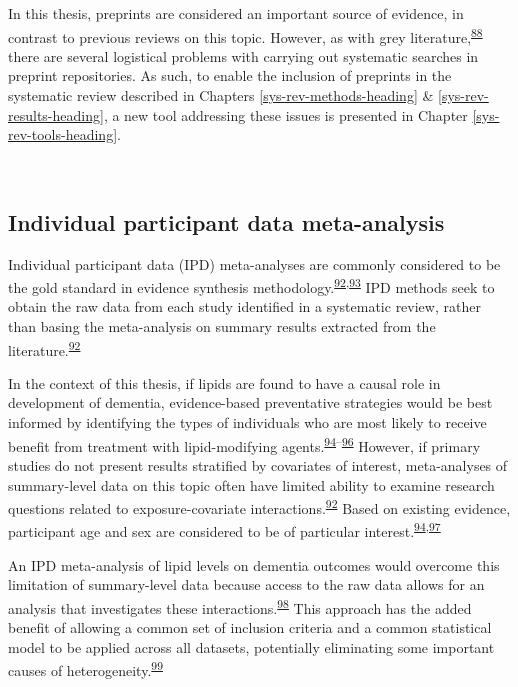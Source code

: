 \documentclass[a4paper, twoside]{templates/ociamthesis}
\begin{document}
In this thesis, preprints are considered an important source of evidence, in contrast to previous reviews on this topic. However, as with grey literature,\textsuperscript{\protect\hyperlink{ref-mahood2014}{88}} there are several logistical problems with carrying out systematic searches in preprint repositories. As such, to enable the inclusion of preprints in the systematic review described in Chapters \ref{sys-rev-methods-heading} \& \ref{sys-rev-results-heading}, a new tool addressing these issues is presented in Chapter \ref{sys-rev-tools-heading}.

~

\hypertarget{individual-participant-data-meta-analysis}{%
\subsection{Individual participant data meta-analysis}\label{individual-participant-data-meta-analysis}}

Individual participant data (IPD) meta-analyses are commonly considered to be the gold standard in evidence synthesis methodology.\textsuperscript{\protect\hyperlink{ref-riley2010}{92},\protect\hyperlink{ref-stewart1993}{93}} IPD methods seek to obtain the raw data from each study identified in a systematic review, rather than basing the meta-analysis on summary results extracted from the literature.\textsuperscript{\protect\hyperlink{ref-riley2010}{92}}

In the context of this thesis, if lipids are found to have a causal role in development of dementia, evidence-based preventative strategies would be best informed by identifying the types of individuals who are most likely to receive benefit from treatment with lipid-modifying agents.\textsuperscript{\protect\hyperlink{ref-arain2009}{94}--\protect\hyperlink{ref-mccartney2016}{96}} However, if primary studies do not present results stratified by covariates of interest, meta-analyses of summary-level data on this topic often have limited ability to examine research questions related to exposure-covariate interactions.\textsuperscript{\protect\hyperlink{ref-riley2010}{92}} Based on existing evidence, participant age and sex are considered to be of particular interest.\textsuperscript{\protect\hyperlink{ref-arain2009}{94},\protect\hyperlink{ref-letenneur1999}{97}}

An IPD meta-analysis of lipid levels on dementia outcomes would overcome this limitation of summary-level data because access to the raw data allows for an analysis that investigates these interactions.\textsuperscript{\protect\hyperlink{ref-riley2020}{98}} This approach has the added benefit of allowing a common set of inclusion criteria and a common statistical model to be applied across all datasets, potentially eliminating some important causes of heterogeneity.\textsuperscript{\protect\hyperlink{ref-stewart2002}{99}}
\end{document}

